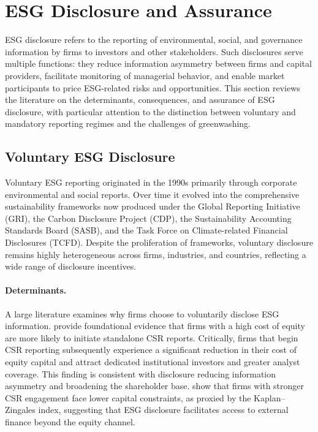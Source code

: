 
\section{ESG Disclosure and Assurance}
\label{sec:disclosure}

ESG disclosure refers to the reporting of environmental, social, and governance
information by firms to investors and other stakeholders. Such disclosures serve
multiple functions: they reduce information asymmetry between firms and capital
providers, facilitate monitoring of managerial behavior, and enable market
participants to price ESG-related risks and opportunities. This section reviews
the literature on the determinants, consequences, and assurance of ESG
disclosure, with particular attention to the distinction between voluntary and
mandatory reporting regimes and the challenges of greenwashing.

\subsection{Voluntary ESG Disclosure}
\label{subsec:voluntary_disclosure}

Voluntary ESG reporting originated in the 1990s primarily through corporate
environmental and social reports. Over time it evolved into the comprehensive
sustainability frameworks now produced under the Global Reporting Initiative
(GRI), the Carbon Disclosure Project (CDP), the Sustainability Accounting
Standards Board (SASB), and the Task Force on Climate-related Financial
Disclosures (TCFD). Despite the proliferation of frameworks, voluntary
disclosure remains highly heterogeneous across firms, industries, and countries,
reflecting a wide range of disclosure incentives.

\paragraph{Determinants.}
A large literature examines why firms choose to voluntarily disclose ESG
information. \textcite{Dhaliwal2011_csr_cost} provide foundational evidence that
firms with a high cost of equity are more likely to initiate standalone CSR
reports. Critically, firms that begin CSR reporting subsequently experience a
significant reduction in their cost of equity capital and attract dedicated
institutional investors and greater analyst coverage. This finding is consistent
with disclosure reducing information asymmetry and broadening the shareholder
base. \textcite{Cheng2014_csr_finance} show that firms with stronger CSR
engagement face lower capital constraints, as proxied by the Kaplan--Zingales
index, suggesting that ESG disclosure facilitates access to external finance
beyond the equity channel.

